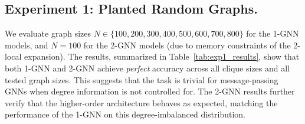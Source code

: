 \subsection{Experiment 1: Planted Random Graphs.}

We evaluate graph sizes $N \in \{100, 200, 300, 400, 500, 600, 700, 800\}$ for the 1-GNN models, and $N = 100$ for the 2-GNN models (due to memory constraints of the 2-local expansion). The results, summarized in Table~\ref{tab:exp1_results}, show that both 1-GNN and 2-GNN achieve \emph{perfect} accuracy across all clique sizes and all tested graph sizes. This suggests that the task is trivial for message-passing GNNs when degree information is not controlled for. The 2-GNN results further verify that the higher-order architecture behaves as expected, matching the performance of the 1-GNN on this degree-imbalanced distribution.








